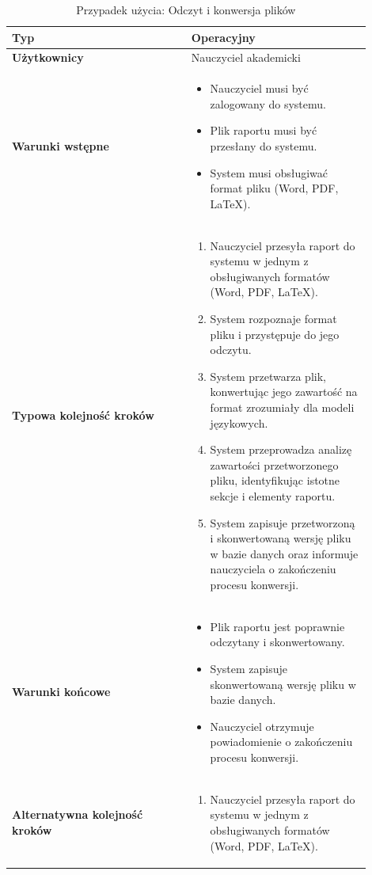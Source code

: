 \documentclass[a4paper, 12pt]{article}
\begin{document}
\footnotesize
\begin{center}
\begin{longtable}{|p{0.45\linewidth}|p{0.45\linewidth}|}
\caption{Przypadek użycia: Odczyt i konwersja plików} \\
\hline
\textbf{Typ} & Operacyjny \\
\hline
\textbf{Użytkownicy} & Nauczyciel akademicki \\
\hline
\textbf{Warunki wstępne} &
\begin{itemize}
    \item Nauczyciel musi być zalogowany do systemu.
    \item Plik raportu musi być przesłany do systemu.
    \item System musi obsługiwać format pliku (Word, PDF, LaTeX).
\end{itemize} \\
\hline
\textbf{Typowa kolejność kroków} &
\begin{enumerate}
    \item Nauczyciel przesyła raport do systemu w jednym z obsługiwanych formatów (Word, PDF, LaTeX).
    \item System rozpoznaje format pliku i przystępuje do jego odczytu.
    \item System przetwarza plik, konwertując jego zawartość na format zrozumiały dla modeli językowych.
    \item System przeprowadza analizę zawartości przetworzonego pliku, identyfikując istotne sekcje i elementy raportu.
    \item System zapisuje przetworzoną i skonwertowaną wersję pliku w bazie danych oraz informuje nauczyciela o zakończeniu procesu konwersji.
\end{enumerate} \\
\hline
\textbf{Warunki końcowe} &
\begin{itemize}
    \item Plik raportu jest poprawnie odczytany i skonwertowany.
    \item System zapisuje skonwertowaną wersję pliku w bazie danych.
    \item Nauczyciel otrzymuje powiadomienie o zakończeniu procesu konwersji.
\end{itemize} \\
\hline
\textbf{Alternatywna kolejność kroków} &
\begin{enumerate}
    \item Nauczyciel przesyła raport do systemu w jednym z obsługiwanych formatów (Word, PDF, LaTeX).

\end{enumerate}
\end{longtable}
\end{center}
\end{document}
